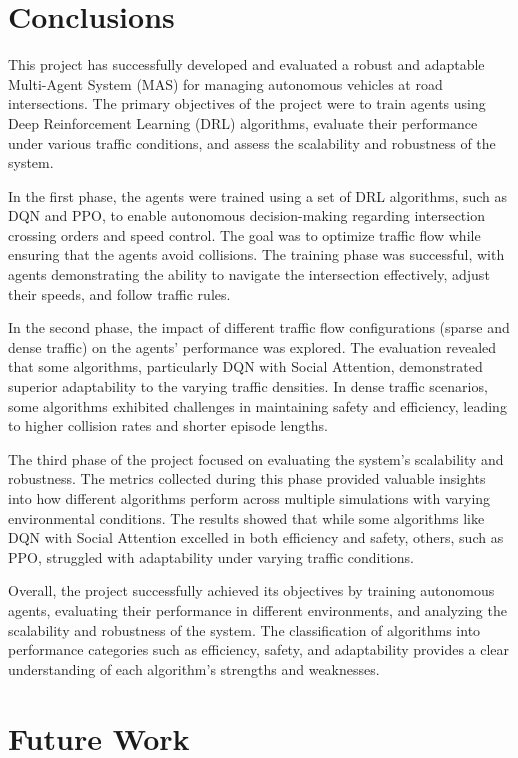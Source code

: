 \section{Conclusions}

This project has successfully developed and evaluated a robust and adaptable Multi-Agent System (MAS) for managing autonomous vehicles at road intersections. The primary objectives of the project were to train agents using Deep Reinforcement Learning (DRL) algorithms, evaluate their performance under various traffic conditions, and assess the scalability and robustness of the system.

In the first phase, the agents were trained using a set of DRL algorithms, such as DQN and PPO, to enable autonomous decision-making regarding intersection crossing orders and speed control. The goal was to optimize traffic flow while ensuring that the agents avoid collisions. The training phase was successful, with agents demonstrating the ability to navigate the intersection effectively, adjust their speeds, and follow traffic rules.

In the second phase, the impact of different traffic flow configurations (sparse and dense traffic) on the agents' performance was explored. The evaluation revealed that some algorithms, particularly DQN with Social Attention, demonstrated superior adaptability to the varying traffic densities. In dense traffic scenarios, some algorithms exhibited challenges in maintaining safety and efficiency, leading to higher collision rates and shorter episode lengths.

The third phase of the project focused on evaluating the system's scalability and robustness. The metrics collected during this phase provided valuable insights into how different algorithms perform across multiple simulations with varying environmental conditions. The results showed that while some algorithms like DQN with Social Attention excelled in both efficiency and safety, others, such as PPO, struggled with adaptability under varying traffic conditions.

Overall, the project successfully achieved its objectives by training autonomous agents, evaluating their performance in different environments, and analyzing the scalability and robustness of the system. The classification of algorithms into performance categories such as efficiency, safety, and adaptability provides a clear understanding of each algorithm's strengths and weaknesses.

\section{Future Work}

